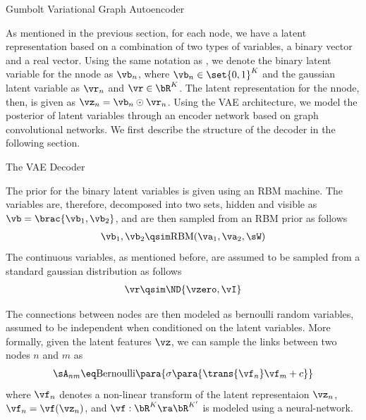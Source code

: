 \documentclass{article}
\begin{document}
\begin{psection}{Gumbolt Variational Graph Autoencoder}

	As mentioned in the previous section, for each node, we have a latent representation based on a combination of two types of variables, a binary vector and a real vector. Using the same notation as \cite{sbm-gnn}, we denote the binary latent variable for the n\tth node as $\vb_n$, where $\vb_n \in \set{0, 1}^K$ and the gaussian latent variable as $\vr_n$ and $\vr \in \bR^K$. The latent representation for the n\tth node, then, is given as $\vz_n = \vb_n \odot \vr_n$. Using the VAE architecture, we model the posterior of latent variables through an encoder network based on graph convolutional networks. We first describe the structure of the decoder in the following section.


	\begin{psubsection}{The VAE Decoder}

		The prior for the binary latent variables is given using an RBM machine. The variables are, therefore, decomposed into two sets, hidden and visible as $\vb = \brac{\vb_1, \vb_2}$, and are then sampled from an RBM prior as follows
		\begin{align}
			\vb_1, \vb_2 \qsim \text{RBM}(\va_1, \va_2, \sW)
			\label{eq:gvgcn-prior-binary}
		\end{align}
		The continuous variables, as mentioned before, are assumed to be sampled from a standard gaussian distribution as follows
		\begin{align}
			\vr \qsim \ND{\vzero, \vI}
			\label{eq:gvgcn-prior-binary}
		\end{align}

		The connections between nodes are then modeled as bernoulli random variables, assumed to be independent when conditioned on the latent variables. More formally, given the latent features $\vz$, we can sample the links between two nodes $n$ and $m$ as
		\begin{align}
			\sA_{nm} \eq \text{Bernoulli}\para{\sigma\para{\trans{\vf_n} \vf_m + c}}
			\label{eq:gvgcn-link}
		\end{align}
		where $\vf_n$ denotes a non-linear transform of the latent representaion $\vz_n$, \ie $\vf_n = \vf(\vz_n)$, and $\vf : \bR^K \ra \bR^{K'}$ is modeled using a neural-network.


\end{psubsection}
\end{psection}
\end{document}
